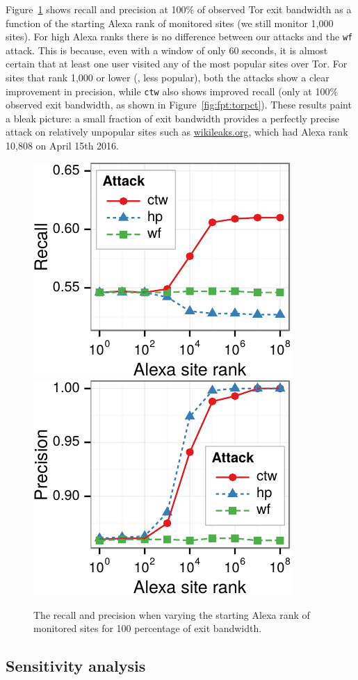 Figure~\ref{fig:fpt:alexa} shows recall and precision at 100\% of
observed Tor exit bandwidth as a function of the starting Alexa rank of
monitored sites (we still monitor 1,000 sites).
For high Alexa ranks there is no difference between our attacks and the
\texttt{wf} attack. This is because, even with a window of only 60 seconds,
it is almost certain that at least one user visited any of the most popular
sites over Tor. For sites that rank 1,000 or lower (\ie, less popular),
both the \name attacks show a clear improvement in precision, while
\texttt{ctw} also shows improved recall (only at 100\% observed exit bandwidth,
as shown in Figure~\ref{fig:fpt:torpct}).
These results paint a bleak picture: a small fraction of exit
bandwidth provides a perfectly precise attack on relatively
{unpopular} sites such as \url{wikileaks.org}, which had Alexa rank
10,808 on April 15th 2016. 

\begin{figure}[t]
\centering
	\includegraphics[width=0.465\linewidth]{figures/fpt/alexa/1kx100+100k-recall-ggplot2}
	\includegraphics[width=0.465\linewidth]{figures/fpt/alexa/1kx100+100k-precision-ggplot2}
\caption{The recall and precision when varying the starting Alexa rank of
monitored sites for 100 percentage of exit bandwidth.}
\label{fig:fpt:alexa}
\end{figure}

\subsection{Sensitivity analysis}


